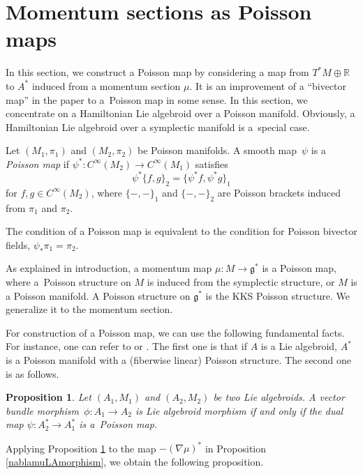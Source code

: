 \documentclass[10pt,a4paper]{amsart}
\numberwithin{equation}{section}
\newtheorem{Proposition}[Theorem]{Proposition}
 { \theoremstyle{definition}
\newtheorem{Definition}[Theorem]{Definition}
\newtheorem{Note}[Theorem]{Note}
\newtheorem{Example}[Theorem]{Example}
\newtheorem{Remark}[Theorem]{Remark}
\newtheorem{Question}[Theorem]{Question}
 }
\def\bR{{\mathbb{R}}}
\newcommand{\sbv}[2]{{\{{{#1},{#2}}\}}}
\begin{document}
\section{Momentum sections as Poisson maps}\label{sec5}
In this section, we construct a Poisson map
by considering a map from $T^*M \oplus \bR$ to $A^*$ induced from a momentum section $\mu$.
It is an improvement of a ``bivector map'' in the paper
\cite{Blohmann:2023} to a~Poisson map in some sense.
In this section, we concentrate on a Hamiltonian Lie algebroid over a Poisson manifold. Obviously, a Hamiltonian Lie algebroid over a symplectic manifold is a~special case.

\begin{Definition}
Let $(M_1, \pi_1)$ and $(M_2, \pi_2)$ be Poisson manifolds.
A smooth map~$\psi$ is a \textit{Poisson map} if
$\psi^*\colon C^{\infty}(M_2) \rightarrow C^{\infty}(M_1)$ satisfies
\[
\psi^* \sbv{f}{g}_2 = \sbv{\psi^* f}{\psi^* g}_1
\]
for $f, g \in C^{\infty}(M_2)$, where $\sbv{-}{-}_1$
and $\sbv{-}{-}_2$ are Poisson brackets induced from $\pi_1$ and $\pi_2$.
\end{Definition}
The condition of a Poisson map is equivalent to the condition for Poisson bivector fields,
$
\psi_* \pi_1 = \pi_2$.


As explained in introduction, a momentum map $\mu\colon M \rightarrow \mathfrak{g}^*$
is a Poisson map, where a~Poisson structure on $M$ is induced from the symplectic structure, or $M$ is a Poisson manifold. A Poisson structure on $\mathfrak{g}^*$ is the KKS Poisson structure.
We generalize it to the momentum section.

For construction of a Poisson map,
we can use the following fundamental facts.
For instance, one can refer to \cite[Theorem 13.70]{CrainicFernandesMurcut} or
 \cite[Proposition 2.13]{Meinrenken02}.
The first one is that
if $A$ is a Lie algebroid, $A^*$ is a Poisson manifold
with a (fiberwise linear) Poisson structure.
The second one is as follows.
\begin{Proposition}\label{dualPoisson}
Let $(A_1, M_1)$ and $(A_2, M_2)$ be two Lie algebroids.
A vector bundle morphism~${\phi\colon A_1 \rightarrow A_2}$ is Lie algebroid morphism
if and only if the dual map $\psi\colon A_2^* \rightarrow A_1^*$ is a~Poisson map.
\end{Proposition}

Applying Proposition \ref{dualPoisson} to the map
$-(\nabla \mu)^*$ in Proposition \ref{nablamuLAmorphism},
we obtain the following proposition.
\end{document}
